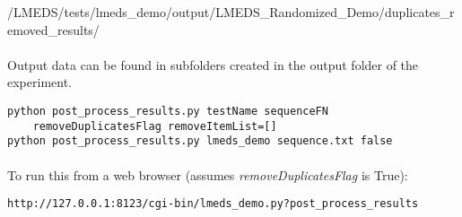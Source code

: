 /LMEDS/tests/lmeds\_demo/output/LMEDS\_Randomized\_Demo/duplicates\_removed\_results/

\paragraph{}
Output data can be found in subfolders created in the output folder of the experiment.

\begin{lstlisting}
python post_process_results.py testName sequenceFN
	removeDuplicatesFlag removeItemList=[]
python post_process_results.py lmeds_demo sequence.txt false
\end{lstlisting}

\paragraph{}
To run this from a web browser (assumes \textit{removeDuplicatesFlag} is True):
\begin{lstlisting}
http://127.0.0.1:8123/cgi-bin/lmeds_demo.py?post_process_results
\end{lstlisting}

